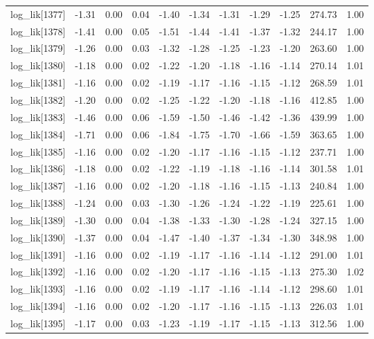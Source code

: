 \begin{table}[ht]
\begin{tabular}{rrrrrrrrrrr}
  log\_lik[1377] & -1.31 & 0.00 & 0.04 & -1.40 & -1.34 & -1.31 & -1.29 & -1.25 & 274.73 & 1.00 \\ 
  log\_lik[1378] & -1.41 & 0.00 & 0.05 & -1.51 & -1.44 & -1.41 & -1.37 & -1.32 & 244.17 & 1.00 \\ 
  log\_lik[1379] & -1.26 & 0.00 & 0.03 & -1.32 & -1.28 & -1.25 & -1.23 & -1.20 & 263.60 & 1.00 \\ 
  log\_lik[1380] & -1.18 & 0.00 & 0.02 & -1.22 & -1.20 & -1.18 & -1.16 & -1.14 & 270.14 & 1.01 \\ 
  log\_lik[1381] & -1.16 & 0.00 & 0.02 & -1.19 & -1.17 & -1.16 & -1.15 & -1.12 & 268.59 & 1.01 \\ 
  log\_lik[1382] & -1.20 & 0.00 & 0.02 & -1.25 & -1.22 & -1.20 & -1.18 & -1.16 & 412.85 & 1.00 \\ 
  log\_lik[1383] & -1.46 & 0.00 & 0.06 & -1.59 & -1.50 & -1.46 & -1.42 & -1.36 & 439.99 & 1.00 \\ 
  log\_lik[1384] & -1.71 & 0.00 & 0.06 & -1.84 & -1.75 & -1.70 & -1.66 & -1.59 & 363.65 & 1.00 \\ 
  log\_lik[1385] & -1.16 & 0.00 & 0.02 & -1.20 & -1.17 & -1.16 & -1.15 & -1.12 & 237.71 & 1.00 \\ 
  log\_lik[1386] & -1.18 & 0.00 & 0.02 & -1.22 & -1.19 & -1.18 & -1.16 & -1.14 & 301.58 & 1.01 \\ 
  log\_lik[1387] & -1.16 & 0.00 & 0.02 & -1.20 & -1.18 & -1.16 & -1.15 & -1.13 & 240.84 & 1.00 \\ 
  log\_lik[1388] & -1.24 & 0.00 & 0.03 & -1.30 & -1.26 & -1.24 & -1.22 & -1.19 & 225.61 & 1.00 \\ 
  log\_lik[1389] & -1.30 & 0.00 & 0.04 & -1.38 & -1.33 & -1.30 & -1.28 & -1.24 & 327.15 & 1.00 \\ 
  log\_lik[1390] & -1.37 & 0.00 & 0.04 & -1.47 & -1.40 & -1.37 & -1.34 & -1.30 & 348.98 & 1.00 \\ 
  log\_lik[1391] & -1.16 & 0.00 & 0.02 & -1.19 & -1.17 & -1.16 & -1.14 & -1.12 & 291.00 & 1.01 \\ 
  log\_lik[1392] & -1.16 & 0.00 & 0.02 & -1.20 & -1.17 & -1.16 & -1.15 & -1.13 & 275.30 & 1.02 \\ 
  log\_lik[1393] & -1.16 & 0.00 & 0.02 & -1.19 & -1.17 & -1.16 & -1.14 & -1.12 & 298.60 & 1.01 \\ 
  log\_lik[1394] & -1.16 & 0.00 & 0.02 & -1.20 & -1.17 & -1.16 & -1.15 & -1.13 & 226.03 & 1.01 \\ 
  log\_lik[1395] & -1.17 & 0.00 & 0.03 & -1.23 & -1.19 & -1.17 & -1.15 & -1.13 & 312.56 & 1.00 \\ 

\end{tabular}
\end{table}
